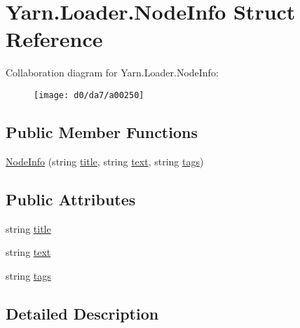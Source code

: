 \hypertarget{a00056}{\section{Yarn.\-Loader.\-Node\-Info Struct Reference}
\label{a00056}
}


Collaboration diagram for Yarn.\-Loader.\-Node\-Info\-:
\nopagebreak
\begin{figure}[H]
\begin{center}
\leavevmode
\texttt{[image: d0/da7/a00250]}
\end{center}
\end{figure}
\subsection*{Public Member Functions}
\begin{DoxyCompactItemize}
\item 
\hyperlink{a00056_aa56085ea115b77cb9ee975686e726c29}{Node\-Info} (string \hyperlink{a00056_aafc45bbc86a9acb9bdbcf7877695a96c}{title}, string \hyperlink{a00056_a63d7ebed8095a20fc5d0d74c84a34f6c}{text}, string \hyperlink{a00056_acd4d4915f6cc14f8b0f1f92d27da8b36}{tags})
\end{DoxyCompactItemize}
\subsection*{Public Attributes}
\begin{DoxyCompactItemize}
\item 
string \hyperlink{a00056_aafc45bbc86a9acb9bdbcf7877695a96c}{title}
\item 
string \hyperlink{a00056_a63d7ebed8095a20fc5d0d74c84a34f6c}{text}
\item 
string \hyperlink{a00056_acd4d4915f6cc14f8b0f1f92d27da8b36}{tags}
\end{DoxyCompactItemize}


\subsection{Detailed Description}


